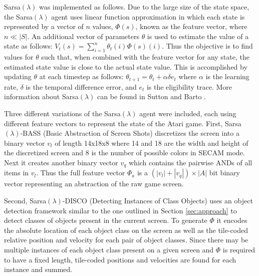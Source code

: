 \documentclass{sig-alternate}
\begin{document}

Sarsa$(\lambda)$ was implemented as follows. Due to the large size of the state space, the Sarsa$(\lambda)$ agent uses linear function approximation in which each state is represented by a vector of $n$ values, $\Phi(s)$, known as the feature vector, where $n \ll |S|$. An additional vector of parameters $\theta$ is used to estimate the value of a state as follows: $V_t(s) = \sum_{i=1}^n \theta_t(i) \Phi(s) (i)$. Thus the objective is to find values for $\theta$ such that, when combined with the feature vector for any state, the estimated state value is close to the actual state value. This is accomplished by updating $\theta$ at each timestep as follows: $\theta_{t+1} = \theta_t + \alpha \delta e_t$ where $\alpha$ is the learning rate, $\delta$ is the temporal difference error, and $e_t$ is the eligibility trace. More information about Sarsa$(\lambda)$ can be found in Sutton and Barto \cite{sutton98}.

Three different variations of the Sarsa$(\lambda)$ agent were included, each using different feature vectors to represent the state of the Atari game. First, Sarsa$(\lambda)$-BASS (Basic Abstraction of Screen Shots) discretizes the screen into a binary vector $v_l$ of length 14x18x8 where 14 and 18 are the width and height of the discretized screen and 8 is the number of possible colors in SECAM mode. Next it creates another binary vector $v_q$ which contains the pairwise ANDs of all items in $v_l$. Thus the full feature vector $\Phi_a$ is a $(|v_l| + |v_q|) \times |A|$ bit binary vector representing an abstraction of the raw game screen. 

Second, Sarsa$(\lambda)$-DISCO (Detecting Instances of Class Objects) uses an object detection framework similar to the one outlined in Section \ref{sec:approach} to detect classes of objects present in the current screen. To generate $\Phi$ it encodes the absolute location of each object class on the screen as well as the tile-coded relative position and velocity for each pair of object classes. Since there may be multiple instances of each object class present on a given screen and $\Phi$ is required to have a fixed length, tile-coded positions and velocities are found for each instance and summed. 
\end{document}
